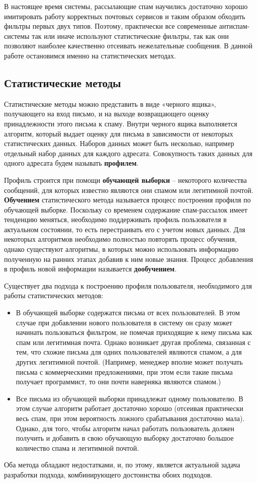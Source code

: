 В настоящее время системы, рассылающие спам научились достаточно хорошо имитировать работу корректных почтовых сервисов и таким образом обходить фильтры первых двух типов. Поэтому, практически все современные антиспам-системы так или иначе используют статистические фильтры, так как они позволяют наиболее качественно отсеивать нежелательные сообщения. В данной работе остановимся именно на статистических методах.
\subsection{Статистические методы}

Статистические методы можно представить в виде «черного ящика», получающего на вход письмо, и на выходе возвращающего оценку принадлежности этого письма к спаму. Внутри черного ящика выполняется алгоритм, который выдает оценку для письма в зависимости от некоторых статистических данных. Наборов данных может быть несколько, например отдельный набор данных для каждого адресата. Совокупность таких данных для одного адресата будем называть \textbf{профилем}.

Профиль строится  при помощи \textbf{обучающей выборки} – некоторого количества сообщений, для которых известно являются они спамом или легитимной почтой. \textbf{Обучением} статистического метода называется процесс построения профиля по обучающей выборке. Поскольку со временем содержание спам-рассылок имеет тенденцию меняться, необходимо поддерживать профиль пользователя в актуальном состоянии, то есть перестраивать его с учетом новых данных. Для некоторых алгоритмов необходимо полностью повторять процесс обучения, однако существуют алгоритмы, в которых можно использовать информацию полученную на ранних этапах добавив к ним новые знания. Процесс добавления в профиль новой информации называется \textbf{дообучением}.

Существует два подхода к построению профиля пользователя, необходимого для работы статистических методов:

\begin{itemize}
\item В обучающей выборке содержатся письма от всех пользователей. В этом случае при добавлении нового пользователя в систему он сразу может начинать пользоваться фильтром, не помечая приходящие к нему письма как спам или  легитимная почта. Однако возникает другая проблема, связанная с тем, что схожие письма для одних пользователей являются спамом, а для других легитимной почтой. (Например, менеджер вполне может получать письма с коммерческими предложениями, при этом если такие письма получает программист, то они почти наверняка являются спамом.)
\item Все письма из обучающей выборки принадлежат одному пользователю. В этом случае алгоритм работает достаточно хорошо (отсеивая практически весь спам, при этом вероятность ложного срабатывания достаточно мала). Однако, для того, чтобы алгоритм начал работать пользователь должен получить и добавить в свою обучающую выборку достаточно большое количество спама и легитимной почтой.
\end{itemize}
Оба метода обладают недостатками, и, по этому, является актуальной задача разработки подхода, комбинирующего достоинства обоих подходов.


